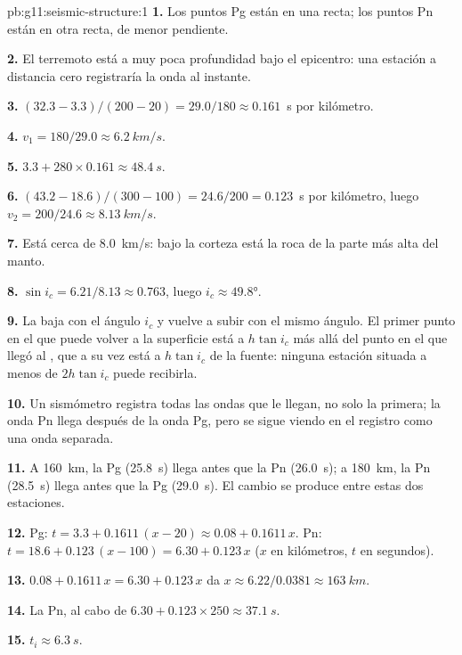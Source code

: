 \begin{solution}{pb:g11:seismic-structure:1}
\textbf{1.} Los puntos Pg están en una recta; los puntos Pn están en otra
recta, de menor pendiente.

\textbf{2.} El terremoto está a muy poca profundidad bajo el epicentro: una
estación a distancia cero registraría la onda al instante.

\textbf{3.} $(32.3 - 3.3)/(200 - 20) = 29.0/180 \approx \num{0.161}$~\unit{s}
por kilómetro.

\textbf{4.} $v_1 = 180/29.0 \approx \qty{6.2}{km/s}$.

\textbf{5.} $3.3 + 280 \times 0.161 \approx \qty{48.4}{s}$.

\textbf{6.} $(43.2 - 18.6)/(300 - 100) = 24.6/200 = \num{0.123}$~\unit{s}
por kilómetro, luego $v_2 = 200/24.6 \approx \qty{8.13}{km/s}$.

\textbf{7.} Está cerca de \qty{8.0}{km/s}: bajo la corteza está la roca de la
parte más alta del manto.

\textbf{8.} $\sin i_c = 6.21/8.13 \approx 0.763$, luego $i_c \approx
\ang{49.8}$.

\textbf{9.} La  baja con el ángulo $i_c$ y vuelve a subir con
el mismo ángulo. El primer punto en el que puede volver a la superficie está
a $h\tan i_c$ más allá del punto en el que llegó al , que a su vez está a
$h\tan i_c$ de la fuente: ninguna estación situada a menos de $2h\tan i_c$
puede recibirla.

\textbf{10.} Un sismómetro registra todas las ondas que le llegan, no solo la
primera; la onda Pn llega después de la onda Pg, pero se sigue viendo en el
registro como una onda separada.

\textbf{11.} A \qty{160}{km}, la Pg (\qty{25.8}{s}) llega antes que la Pn
(\qty{26.0}{s}); a \qty{180}{km}, la Pn (\qty{28.5}{s}) llega antes que la Pg
(\qty{29.0}{s}). El cambio se produce entre estas dos estaciones.

\textbf{12.} Pg: $t = 3.3 + 0.1611\,(x - 20) \approx 0.08 + 0.1611\,x$. Pn:
$t = 18.6 + 0.123\,(x - 100) = 6.30 + 0.123\,x$ ($x$ en kilómetros, $t$ en
segundos).

\textbf{13.} $0.08 + 0.1611\,x = 6.30 + 0.123\,x$ da $x \approx
6.22/0.0381 \approx \qty{163}{km}$.

\textbf{14.} La Pn, al cabo de $6.30 + 0.123 \times 250 \approx \qty{37.1}{s}$.

\textbf{15.} $t_i \approx \qty{6.3}{s}$.


\end{solution}
